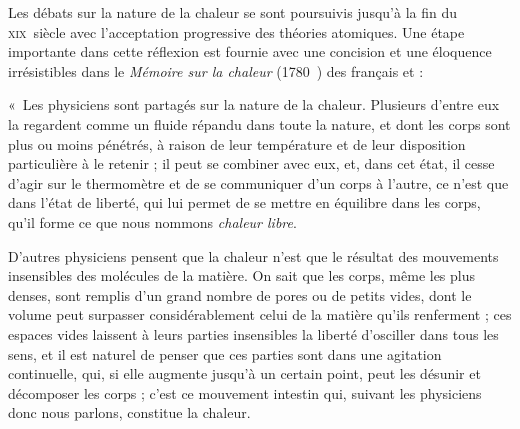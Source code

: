 \atstartofhistorysection
{}
\label{ch_histoire_lavoisier_laplace_depondt}


	Les débats sur la nature de la chaleur se sont poursuivis jusqu'à la fin du \textsc{xix}\ieme\ siècle avec l'acceptation progressive des théories atomiques. Une étape importante dans cette réflexion est fournie avec une concision et une éloquence irrésistibles dans le \textit{Mémoire sur la chaleur} (1780~\cite{lavoisierlaplace1780}) des français  et  :

	\onlyframabook{\begin{quote}} «~Les physiciens sont partagés sur la nature de la chaleur. Plusieurs d’entre eux la regardent comme un fluide répandu dans toute la nature, et dont les corps sont plus ou moins pénétrés, à raison de leur température et de leur disposition particulière à le retenir ; il peut se combiner avec eux, et, dans cet état, il cesse d’agir sur le thermomètre et de se communiquer d’un corps à l’autre, ce n’est que dans l’état de liberté, qui lui permet de se mettre en équilibre dans les corps, qu’il forme ce que nous nommons \textit{chaleur libre}.

	D’autres physiciens pensent que la chaleur n’est que le résultat des mouvements insensibles des molécules de la matière. On sait que les corps, même les plus denses, sont remplis d’un grand nombre de pores ou de petits vides, dont le volume peut surpasser considérablement celui de la matière qu’ils renferment ; ces espaces vides laissent à leurs parties insensibles la liberté d’osciller dans tous les sens, et il est naturel de penser que ces parties sont dans une agitation continuelle, qui, si elle augmente jusqu’à un certain point, peut les désunir et décomposer les corps ; c’est ce mouvement intestin qui, suivant les physiciens donc nous parlons, constitue la chaleur.

